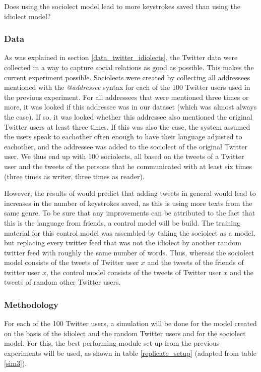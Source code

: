 \documentclass[12pt]{article}
\begin{document}
\begin{examples}
\item Does using the sociolect model lead to more keystrokes saved than using the idiolect model?
\end{examples}

\subsubsection{Data}
As was explained in section \ref{data_twitter_idiolects}, the Twitter data were collected in a way to capture social relations as good as possible. This makes the current experiment possible. Sociolects were created by collecting all addressees mentioned with the \emph{@addressee} syntax for each of the 100 Twitter users used in the previous experiment. For all addressees that were mentioned three times or more, it was looked if this addressee was in our dataset (which was almost always the case). If so, it was looked whether this addressee also mentioned the original Twitter users at least three times. If this was also the case, the system assumed the users speak to eachother often enough to have their language adjusted to eachother, and the addressee was added to the sociolect of the original Twitter user. We thus end up with 100 sociolects, all based on the tweets of a Twitter user and the tweets of the persons that he communicated with at least six times (three times as writer, three times as reader).

However, the results of  would predict that adding tweets in general would lead to increases in the number of keystrokes saved, as this is using more texts from the same genre. To be sure that any improvements can be attributed to the fact that this is the language from friends, a control model will be build. The training material for this control model was assembled by taking the sociolect as a model, but replacing every twitter feed that was not the idiolect by another random twitter feed with roughly the same number of words. Thus, whereas the sociolect model consists of the tweets of Twitter user $x$ and the tweets of the friends of twitter user $x$, the control model consists of the tweets of Twitter user $x$ and the tweets of random other Twitter users.

\subsubsection{Methodology}

For each of the 100 Twitter users, a simulation will be done for the model created on the basis of the idiolect and the random Twitter users and for the sociolect model. For this, the best performing module set-up from the previous experiments will be used, as shown in table \ref{replicate_setup} (adapted from table \ref{sim3}).
\end{document}
